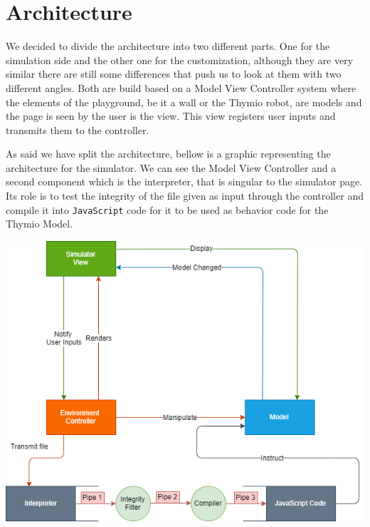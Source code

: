 \documentclass{scrbook}
\begin{document}

\chapter{Architecture}

We decided to divide the architecture into two different parts. One for the simulation side and the other one for the customization, although they are very similar there are still some differences that push us to look at them with two different angles. Both are build based on a Model View Controller system where the elements of the playground, be it a wall or the Thymio robot, are models and the page is seen by the user is the view. This view registers user inputs and transmits them to the controller. 

As said we have split the architecture, bellow is a graphic representing the architecture for the simulator. We can see the Model View Controller and a second component which is the interpreter, 
that is singular to the simulator page. Its role is to test the integrity of the file given as input through the controller and compile it into \texttt{JavaScript} code for it to be used as behavior code for the Thymio Model.

\begin{center}
  \includegraphics[width=\textwidth]{./architecture_proposal-Page-1}
\end{center}
\end{document}
